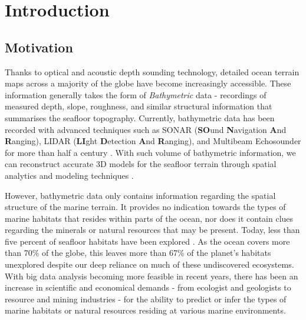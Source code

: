 \chapter{Introduction}
\label{Introduction}

	\section{Motivation}
	\label{Introduction:Motivation}
	
		Thanks to optical and acoustic depth sounding technology, detailed ocean terrain maps across a majority of the globe have become increasingly accessible. These information generally takes the form of \textit{Bathymetric} data - recordings of measured depth, slope, roughness, and similar structural information that summarises the seafloor topography. Currently, bathymetric data has been recorded with advanced techniques such as SONAR (\textbf{SO}und \textbf{N}avigation \textbf{A}nd \textbf{R}anging), LIDAR (\textbf{LI}ght \textbf{D}etection \textbf{A}nd \textbf{R}anging), and Multibeam Echosounder for more than half a century \citep{Niedzielski2013231, Colbo201441}. With such volume of bathymetric information, we can reconstruct accurate 3D models for the seafloor terrain through spatial analytics and modeling techniques \citep{Niedzielski2013231}.
		
		However, bathymetric data only contains information regarding the spatial structure of the marine terrain. It provides no indication towards the types of marine habitats that resides within parts of the ocean, nor does it contain clues regarding the minerals or natural resources that may be present. Today, less than five percent of seafloor habitats have been explored \citep{NOAA}. As the ocean covers more than 70\% of the globe, this leaves more than 67\% of the planet's habitats unexplored despite our deep reliance on much of these undiscovered ecosystems. With big data analysis becoming more feasible in recent years, there has been an increase in scientific and economical demands - from ecologist and geologists to resource and mining industries - for the ability to predict or infer the types of marine habitats or natural resources residing at various marine environments.
		
